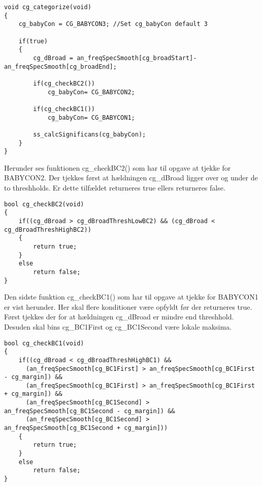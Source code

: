 \begin{verbatim}void cg_categorize(void)
{
    cg_babyCon = CG_BABYCON3; //Set cg_babyCon default 3

    if(true)
    {
        cg_dBroad = an_freqSpecSmooth[cg_broadStart]-an_freqSpecSmooth[cg_broadEnd];

        if(cg_checkBC2())
            cg_babyCon= CG_BABYCON2;

        if(cg_checkBC1())
            cg_babyCon= CG_BABYCON1;

        ss_calcSignificans(cg_babyCon);
    }
}
\end{verbatim}

Herunder ses funktionen cg\_checkBC2() som har til opgave at tjekke for BABYCON2. 
Der tjekkes først at hældningen cg\_dBroad ligger over og under de to threshholds. Er dette tilfældet returneres true ellers returneres false. 

\begin{verbatim}
bool cg_checkBC2(void)
{
    if((cg_dBroad > cg_dBroadThreshLowBC2) && (cg_dBroad < cg_dBroadThreshHighBC2))
    {
        return true;
    }
    else
        return false;
}
\end{verbatim}

Den sidste funktion cg\_checkBC1() som har til opgave at tjekke for BABYCON1 er vist herunder. 
Her skal flere konditioner være opfyldt før der returneres true. Først tjekkes der for at hældningen cg\_dBroad er mindre end threshhold. Desuden skal bins cg\_BC1First og cg\_BC1Second være lokale maksima. 

\begin{verbatim}
bool cg_checkBC1(void)
{
    if((cg_dBroad < cg_dBroadThreshHighBC1) &&
	  (an_freqSpecSmooth[cg_BC1First] > an_freqSpecSmooth[cg_BC1First - cg_margin]) &&
	  (an_freqSpecSmooth[cg_BC1First] > an_freqSpecSmooth[cg_BC1First + cg_margin]) &&
	  (an_freqSpecSmooth[cg_BC1Second] > an_freqSpecSmooth[cg_BC1Second - cg_margin]) &&
	  (an_freqSpecSmooth[cg_BC1Second] > an_freqSpecSmooth[cg_BC1Second + cg_margin]))
    {
        return true;
    }
    else
        return false;
}
\end{verbatim}

